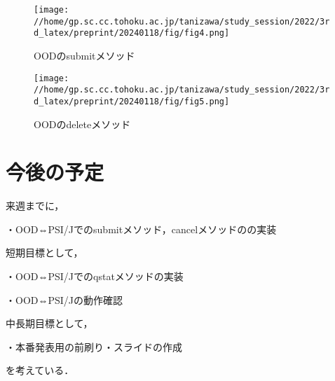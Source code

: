 \documentclass[a4paper,oneside,twocolumn,notitlepage,dvipdfmx]{jsarticle}
\begin{document}
\begin{figure}[h]
  \centering
  \texttt{[image: //home/gp.sc.cc.tohoku.ac.jp/tanizawa/study\_session/2022/3rd\_latex/preprint/20240118/fig/fig4.png]}
  \caption{OODのsubmitメソッド}
  \label{fig4}
\end{figure}

\begin{figure}[h]
  \centering
  \texttt{[image: //home/gp.sc.cc.tohoku.ac.jp/tanizawa/study\_session/2022/3rd\_latex/preprint/20240118/fig/fig5.png]}
  \caption{OODのdeleteメソッド}
  \label{fig5}
\end{figure}

\section{今後の予定}
来週までに，\par
・OOD⇔PSI/Jでのsubmitメソッド，cancelメソッドのの実装\par
短期目標として，\par
・OOD⇔PSI/Jでのqstatメソッドの実装\par
・OOD⇔PSI/Jの動作確認\par
中長期目標として，\par
・本番発表用の前刷り・スライドの作成\par
を考えている．\par



\end{document}
